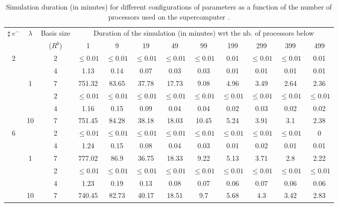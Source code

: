 \begin{table}[ht]
\centering      %
{\scriptsize
\begin{tabular}[c]{c|c|c||c|c|c|c|c|c|c|c|c} 
\toprule[1pt]
\multicolumn{1}{c|}{$\sharp \; e^{-}$}    &\multicolumn{1}{c|}{$\lambda$}        & \multicolumn{1}{c||}{Basis size} & \multicolumn{9}{c}{Duration of the simulation (in minutes) wrt the nb. of processors below}\\
\multicolumn{1}{c|}{} &\multicolumn{1}{c|}{} & \multicolumn{1}{c||}{($R^b$)}    & \multicolumn{1}{c|}{1} & \multicolumn{1}{c|}{9}& \multicolumn{1}{c|}{19}& \multicolumn{1}{c|}{49}& \multicolumn{1}{c|}{99}& \multicolumn{1}{c|}{199}& \multicolumn{1}{c|}{299}& \multicolumn{1}{c|}{399}& \multicolumn{1}{c}{499}\\
\hline
\multirow{6}{*}{2} &                      & 2 & $\leq 0.01$ & $\leq 0.01$ & $\leq 0.01$ & $\leq 0.01$ & $\leq 0.01$ & 0.01 & $\leq 0.01$ & $\leq 0.01$ & 0.01  \\ \cline{3-12}
		   &                      & 4 & 1.13 & 0.14 & 0.07 & 0.03 & 0.03 & 0.01 & 0.01 & 0.01 & 0.01  \\ \cline{3-12}
		   & \multirow{-3}{*}{1}  & 7 & 751.32 & 83.65 & 37.78 & 17.73 & 9.08 & 4.96 & 3.49 & 2.64 & 2.36  \\ \cline{2-12}
		   &                      & 2 & $\leq 0.01$ & $\leq 0.01$ & $\leq 0.01$ & $\leq 0.01$ & $\leq 0.01$ & $\leq 0.01$ & $\leq 0.01$ & $\leq 0.01$ & $\leq 0.01$  \\ \cline{3-12}
		   &                      & 4 & 1.16 & 0.15 & 0.09 & 0.04 & 0.04 & 0.02 & 0.03 & 0.02 & 0.02  \\ \cline{3-12}
		   & \multirow{-3}{*}{10} & 7 & 751.45 & 84.28 & 38.18 & 18.03 & 10.45 & 5.24 & 3.91 & 3.1 & 2.38  \\ \hline
\multirow{6}{*}{6} &                      & 2 & $\leq 0.01$ & $\leq 0.01$ & $\leq 0.01$ & $\leq 0.01$ & $\leq 0.01$ & $\leq 0.01$ & $\leq 0.01$ & $\leq 0.01$ & 0  \\ \cline{3-12}
		   &                      & 4 & 1.24 & 0.15 & 0.08 & 0.04 & 0.03 & 0.01 & 0.02 & 0.01 & 0.01  \\ \cline{3-12}
		   & \multirow{-3}{*}{1}  & 7 & 777.02 & 86.9 & 36.75 & 18.33 & 9.22 & 5.13 & 3.71 & 2.8 & 2.22  \\ \cline{2-12}
		   &                      & 2 & $\leq 0.01$ & $\leq 0.01$ & $\leq 0.01$ & $\leq 0.01$ & $\leq 0.01$ & $\leq 0.01$ & $\leq 0.01$ & $\leq 0.01$ & $\leq 0.01$  \\ \cline{3-12}
		   &                      & 4 & 1.23 & 0.19 & 0.13 & 0.08 & 0.07 & 0.06 & 0.07 & 0.06 & 0.06  \\ \cline{3-12}
		   & \multirow{-3}{*}{10} & 7 & 740.45 & 82.73 & 40.17 & 18.51 & 9.7 & 5.68 & 4.3 & 3.42 & 2.83  \\ \hline
\end{tabular}
}
 \caption{Simulation duration (in minutes) for different configurations of parameters as a function of the number of processors used on the supercomputer .}
\label{table:scalingMPI} 
\end{table} 


